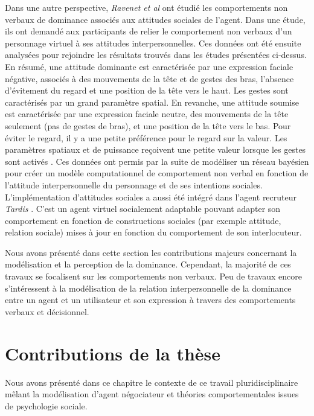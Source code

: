 		Dans une autre perspective,  \emph{Ravenet et al} \cite{ravenet2013user} ont étudié les comportements non verbaux de dominance associés aux attitudes sociales de l'agent. Dans une étude, ils ont demandé aux participants de relier le comportement non verbaux d'un personnage virtuel à ses attitudes interpersonnelles. Ces données ont été ensuite analysées pour rejoindre les résultats trouvés dans les études présentées ci-dessus.  
		En résumé, une attitude dominante est caractérisée par une expression faciale négative, associés à des mouvements de la tête et de gestes des bras, l'absence d'évitement du regard et une position de la tête vers le haut. Les gestes sont caractérisés par un grand paramètre spatial. En revanche, une attitude soumise est caractérisée par une expression faciale neutre, des mouvements de la tête seulement (pas de gestes de bras), et une position de la tête vers le bas. Pour éviter le regard, il y a une petite préférence pour le regard sur la valeur. Les paramètres spatiaux et de puissance reçoivent une petite valeur lorsque les gestes sont activés \cite{ravenet2013user}. Ces données ont permis par la suite de
		modéliser un réseau bayésien pour créer un modèle computationnel de comportement non verbal en fonction de l'attitude interpersonnelle du personnage et de ses intentions sociales.
		L'implémentation d'attitudes sociales a aussi été intégré dans l'agent recruteur \emph{Tardis} \cite{youssef2015towards}. C'est un agent virtuel socialement adaptable pouvant adapter son comportement en fonction de constructions sociales (par exemple attitude, relation sociale) mises à jour en fonction du comportement de son interlocuteur. 
		
		Nous avons présenté dans cette section les contributions majeurs concernant la modélisation et la perception de la dominance. Cependant, la majorité de ces travaux se focalisent sur les comportements non verbaux. Peu de travaux encore s'intéressent à la modélisation de la relation interpersonnelle de la dominance entre un agent et un utilisateur et son expression à travers des comportements verbaux et décisionnel. 
	
	
		\section{Contributions de la thèse}
			Nous avons présenté dans ce chapitre le contexte de ce travail pluridisciplinaire mêlant la modélisation d'agent négociateur et théories comportementales issues de psychologie sociale. 
			
